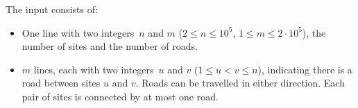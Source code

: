 
    The input consists of:
    \begin{itemize}
        \item One line with two integers~$n$ and $m$
            ($2\leq n\leq 10^{5}$,
            $1\leq m\leq 2\cdot 10^{5}$),
            the number of sites and the number of roads.
        \item $m$ lines, each with two integers~$u$ and $v$ ($1\leq u < v \leq n$),
            indicating there is a road between sites $u$ and $v$.
            Roads can be travelled in either direction.
            Each pair of sites is connected by at most one road.
    \end{itemize}
